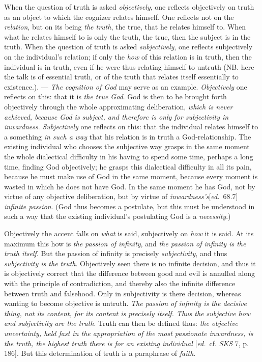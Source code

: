 \documentclass[12pt,a4paper,openany]{book}
\newcommand{\kpage}[1]{\marginnote{\footnotesize\textit{[#1]}}}
\newcommand{\ed}[1]{{\small[\textit{ed.}\ #1]}}
\begin{document}
When the question of truth is asked \emph{objectively}, one reflects objectively
on truth as an object to which the cognizer
relates himself. One reflects not on the \emph{relation}, but on its being
\emph{the truth}, the true, that he relates himself to. When what he relates
himself to is only the truth, the true, then the subject is in the truth.
When the question of truth is asked \emph{subjectively}, one reflects
subjectively on the individual's relation; if only the \emph{how} of this relation
is in truth, then the individual is in truth, even if he were thus
relating himself to untruth (NB. here the talk is of essential truth,
or of the truth that relates itself essentially to existence.).
--- \emph{The cognition of God} may serve as an example. \emph{Objectively} one reflects
on this: that it is \emph{the true God}. God is then to be brought forth objectively
through the whole approximating deliberation, \emph{which is never achieved,
because God is subject, and therefore is only for subjectivity in inwardness}. \emph{Subjectively} one reflects
\kpage{119}on this: that the individual relates himself to a something \emph{in such a way} that
his relation is in truth a God-relationship. The existing individual who
chooses the subjective way grasps in the same moment the whole dialectical
difficulty in his having to spend some time, perhaps a long
time, finding God objectively; he grasps this dialectical difficulty
in all its pain, because he must make use of God in the same moment,
because every moment is wasted in which he does not have God. In the same
moment he has God, not by virtue of any objective deliberation,
but by virtue of \emph{inwardness's}\ed{68.7} \emph{infinite passion}. (God thus becomes
a postulate, but this must be understood in such a way that the existing
individual's postulating God is a \emph{necessity}.)

Objectively the accent falls on \emph{what} is said, subjectively on \emph{how} it is said.
At its maximum this how is \emph{the passion of infinity}, and
\emph{the passion of infinity is the truth itself}. But the passion of infinity
is precisely \emph{subjectivity}, and thus \emph{subjectivity is the truth}.
Objectively seen there is no infinite decision, and thus it is
objectively correct that the difference between good and evil is annulled
along with the principle of contradiction, and thereby also the infinite
difference between truth and falsehood. Only in subjectivity is there decision,
whereas wanting to become objective is untruth. \emph{The passion of
infinity is the decisive thing, not its content, for its content is precisely
itself. Thus the subjective how and subjectivity are the truth}.
Truth can then be defined thus: \emph{the objective uncertainty, held fast in
the appropriation of the most passionate inwardness, is the truth, the highest truth
there is for an existing individual} \ed{cf. \emph{SKS} 7, p. 186}. But this determination
of truth is a paraphrase of \emph{faith}.
\end{document}
